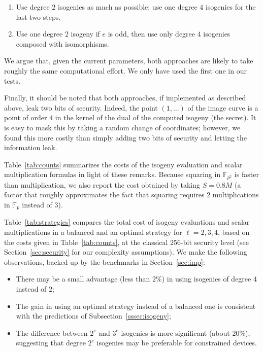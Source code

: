 \documentclass[jmc]{degruyter-journal-a}
\theoremstyle{definition}
\newcommand{\FF}{{\mathbb{F}}}
\begin{document}
\begin{enumerate}
\item Use degree $2$ isogenies as much as possible; use one degree $4$
  isogenies for the last two steps.
\item Use one degree $2$ isogeny if $e$ is odd, then use only degree
  $4$ isogenies composed with isomorphisms.
\end{enumerate}

We argue that, given the current parameters, both approaches are
likely to take roughly the same computational effort. We only have
used the first one in our tests.

Finally, it should be noted that both approaches, if implemented as
described above, leak two bits of security. Indeed, the point
$(1,\ldots)$ of the image curve is a point of order $4$ in the kernel
of the dual of the computed isogeny (the secret). It is easy to mask
this by taking a random change of coordinates; however, we found this
more costly than simply adding two bits of security and letting the
information leak.

Table~\ref{tab:counts} summarizes the costs of the isogeny evaluation
and scalar multiplication formulas in light of these remarks. Because
squaring in $\FF_{p^2}$ is faster than multiplication, we also report
the cost obtained by taking $S=0.8M$ (a factor that roughly
approximates the fact that squaring requires $2$ multiplications in
$\FF_p$ instead of $3$).

Table~\ref{tab:strategies} compares the total cost of isogeny
evaluations and scalar multiplications in a balanced and an optimal
strategy for $\ell=2,3,4$, based on the costs given in
Table~\ref{tab:counts}, at the classical 256-bit security level (see
Section~\ref{sec:security} for our complexity assumptions). We make the following observations, backed up by the benchmarks in Section~\ref{sec:imp}:
\begin{itemize}
\item There may be a small advantage (less than $2\%$) in using
  isogenies of degree $4$ instead of $2$;
\item The gain in using an optimal strategy instead of a balanced one
  is consistent with the predictions of
  Subsection~\ref{sssec:isogeny};
\item The difference between $2^e$ and $3^e$ isogenies is more
  significant (about $20\%$), suggesting that degree $2^e$ isogenies
  may be preferable for constrained devices.
\end{itemize}
\end{document}
